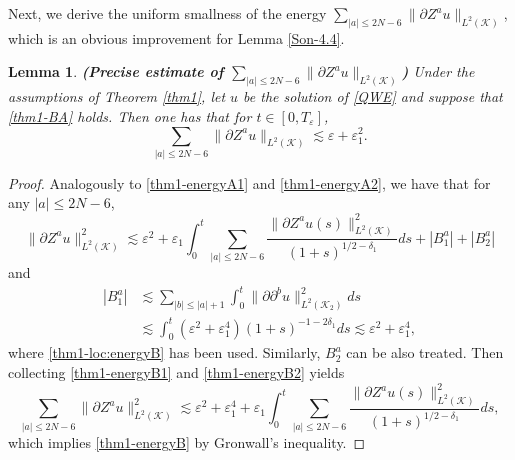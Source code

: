 \documentclass[11pt,twoside]{article}
\def\cK{\mathcal K}
\def\ds{\displaystyle}
\def\p{\partial}
\def\ve{\varepsilon}
\def\ls{\lesssim}
\theoremstyle{plain}
\newtheorem{lemma}[theorem]{Lemma}
\theoremstyle{definition}
\numberwithin{equation}{section}
\begin{document}
Next, we derive the uniform smallness of the energy $\ds\sum_{|a|\le2N-6}\|\p Z^au\|_{L^2(\cK)}$,
which is an obvious improvement for Lemma \ref{Son-4.4}.
\begin{lemma}
{\bf (Precise estimate of $\ds\sum_{|a|\le2N-6}\|\p Z^au\|_{L^2(\cK)}$)}
Under the assumptions of Theorem \ref{thm1}, let $u$ be the solution of \eqref{QWE} and suppose that \eqref{thm1-BA} holds.
Then one has that for $t\in[0,T_\ve]$,
\begin{equation}\label{thm1-energyB}
\sum_{|a|\le2N-6}\|\p Z^au\|_{L^2(\cK)}\ls\ve+\ve_1^2.
\end{equation}
\end{lemma}
\begin{proof}
Analogously to \eqref{thm1-energyA1} and \eqref{thm1-energyA2}, we have that for any $|a|\le2N-6$,
\begin{equation}\label{thm1-energyB1}
\|\p Z^au\|^2_{L^2(\cK)}\ls\ve^2+\ve_1\int_0^t\sum_{|a|\le2N-6}\frac{\|\p Z^au(s)\|^2_{L^2(\cK)}}{(1+s)^{1/2-\delta_1}}ds+|B^a_1|+|B^a_2|
\end{equation}
and
\begin{equation}\label{thm1-energyB2}
\begin{split}
|B^a_1|&\ls\sum_{|b|\le|a|+1}\int_0^t\|\p \p^bu\|^2_{L^2(\cK_2)}ds\\
&\ls\int_0^t(\ve^2+\ve_1^4)(1+s)^{-1-2\delta_1}ds
\ls\ve^2+\ve_1^4,
\end{split}
\end{equation}
where \eqref{thm1-loc:energyB} has been used. Similarly, $B^a_2$ can be also treated.
Then collecting \eqref{thm1-energyB1} and \eqref{thm1-energyB2} yields
\begin{equation*}
\sum_{|a|\le2N-6}\|\p Z^au\|^2_{L^2(\cK)}\ls\ve^2+\ve_1^4
+\ve_1\int_0^t\sum_{|a|\le2N-6}\frac{\|\p Z^au(s)\|^2_{L^2(\cK)}}{(1+s)^{1/2-\delta_1}}ds,
\end{equation*}
which implies \eqref{thm1-energyB} by Gronwall's inequality.
\end{proof}
\end{document}
